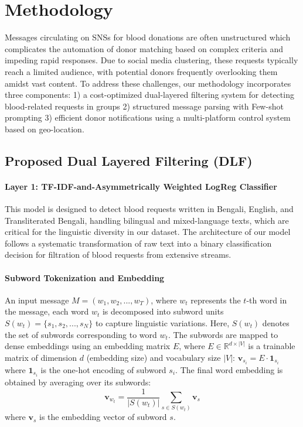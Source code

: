 \documentclass[11pt]{article}
\begin{document}
\section{Methodology}
Messages circulating on SNSs for blood donations are often unstructured which complicates the automation of donor matching based on complex criteria and impeding rapid responses. Due to social media clustering, these requests typically reach a limited audience, with potential donors frequently overlooking them amidst vast content. To address these challenges, our methodology incorporates three components: 1) a cost-optimized dual-layered filtering system for detecting blood-related requests in groups 2) structured message parsing with Few-shot prompting 3) efficient donor notifications using a multi-platform control system based on geo-location. 




\subsection{Proposed Dual Layered Filtering (DLF)}
\paragraph{\textbf{Layer 1: TF-IDF-and-Asymmetrically Weighted LogReg Classifier}}
This model is designed to detect blood requests written in Bengali, English, and Transliterated Bengali, handling bilingual and mixed-language texts, which are critical for the linguistic diversity in our dataset. The architecture of our model follows a systematic transformation of raw text into a binary classification decision for filtration of blood requests from extensive streams. 
\paragraph{\textbf{Subword Tokenization and Embedding}}
An input message \( M = (w_1, w_2, ..., w_T) \), where \( w_t \) represents the \( t \)-th word in the message, each word \( w_t \) is decomposed into subword units \( S(w_t) = \{ s_1, s_2, ..., s_N \} \) to capture linguistic variations. Here, \( S(w_t) \) denotes the set of subwords corresponding to word \( w_t \). The subwords are mapped to dense embeddings using an embedding matrix \( E \), where \( E \in \mathbb{R}^{d \times |V|} \) is a trainable matrix of dimension \( d \) (embedding size) and vocabulary size \( |V| \):
$\mathbf{v}_{s_i} = E \cdot \mathbf{1}_{s_i}$
where \( \mathbf{1}_{s_i} \) is the one-hot encoding of subword \( s_i \). The final word embedding is obtained by averaging over its subwords:
\begin{equation}
    \mathbf{v}_{w_t} = \frac{1}{|S(w_t)|} \sum_{s \in S(w_t)} \mathbf{v}_s
\end{equation}
where \( \mathbf{v}_s \) is the embedding vector of subword \( s \).
\end{document}
